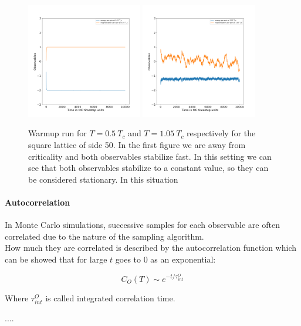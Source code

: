 \begin{figure}[H]
    \centering
    \includegraphics[width=0.45\textwidth]{FIG/exercise_5_images/warmup_observables_temp0.25T_c_dimension50.png} \hspace{0.5cm}
    \includegraphics[width=0.45\textwidth]{FIG/exercise_5_images/warmup_observables_temp1.05T_c_dimension50.png}
    \caption{Warmup run for $T=0.5\ T_c$ and $T=1.05\ T_c$ respectively for the square lattice of side 50.
    In the first figure we are away from criticality and both observables stabilize fast. In this setting we can see that 
    both observables stabilize to a constant value, so they can be considered stationary. In this situation }
    \label{lec5:thermalization}
\end{figure}

\paragraph{Autocorrelation} In Monte Carlo simulations, successive samples for each observable are often correlated due to the nature of the sampling algorithm. \\
How much they are correlated is described by the autocorrelation function which can be showed that for large $t$ goes to 0 as an exponential:

$$ C_O(T) \sim e^{-t/\tau^O_{int}} $$

Where $\tau^O_{int}$ is called integrated correlation time.


....


